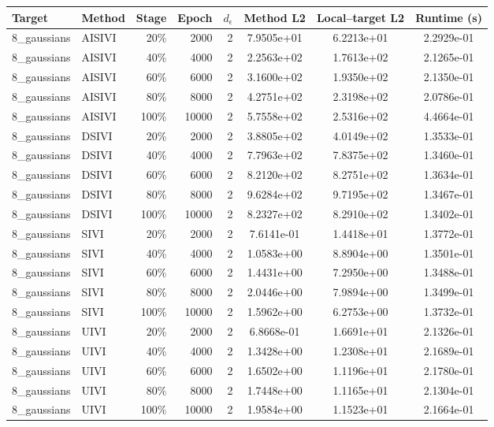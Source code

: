 \begin{tabular}{llrrrccc}
\toprule
Target & Method & Stage & Epoch & $d_\epsilon$ & Method L2 & Local--target L2 & Runtime (s) \\
\midrule
8\_gaussians & AISIVI & 20\% & 2000 & 2 & 7.9505e+01 & 6.2213e+01 & 2.2929e-01 \\
8\_gaussians & AISIVI & 40\% & 4000 & 2 & 2.2563e+02 & 1.7613e+02 & 2.1265e-01 \\
8\_gaussians & AISIVI & 60\% & 6000 & 2 & 3.1600e+02 & 1.9350e+02 & 2.1350e-01 \\
8\_gaussians & AISIVI & 80\% & 8000 & 2 & 4.2751e+02 & 2.3198e+02 & 2.0786e-01 \\
8\_gaussians & AISIVI & 100\% & 10000 & 2 & 5.7558e+02 & 2.5316e+02 & 4.4664e-01 \\
8\_gaussians & DSIVI & 20\% & 2000 & 2 & 3.8805e+02 & 4.0149e+02 & 1.3533e-01 \\
8\_gaussians & DSIVI & 40\% & 4000 & 2 & 7.7963e+02 & 7.8375e+02 & 1.3460e-01 \\
8\_gaussians & DSIVI & 60\% & 6000 & 2 & 8.2120e+02 & 8.2751e+02 & 1.3634e-01 \\
8\_gaussians & DSIVI & 80\% & 8000 & 2 & 9.6284e+02 & 9.7195e+02 & 1.3467e-01 \\
8\_gaussians & DSIVI & 100\% & 10000 & 2 & 8.2327e+02 & 8.2910e+02 & 1.3402e-01 \\
8\_gaussians & SIVI & 20\% & 2000 & 2 & 7.6141e-01 & 1.4418e+01 & 1.3772e-01 \\
8\_gaussians & SIVI & 40\% & 4000 & 2 & 1.0583e+00 & 8.8904e+00 & 1.3501e-01 \\
8\_gaussians & SIVI & 60\% & 6000 & 2 & 1.4431e+00 & 7.2950e+00 & 1.3488e-01 \\
8\_gaussians & SIVI & 80\% & 8000 & 2 & 2.0446e+00 & 7.9894e+00 & 1.3499e-01 \\
8\_gaussians & SIVI & 100\% & 10000 & 2 & 1.5962e+00 & 6.2753e+00 & 1.3732e-01 \\
8\_gaussians & UIVI & 20\% & 2000 & 2 & 6.8668e-01 & 1.6691e+01 & 2.1326e-01 \\
8\_gaussians & UIVI & 40\% & 4000 & 2 & 1.3428e+00 & 1.2308e+01 & 2.1689e-01 \\
8\_gaussians & UIVI & 60\% & 6000 & 2 & 1.6502e+00 & 1.1196e+01 & 2.1780e-01 \\
8\_gaussians & UIVI & 80\% & 8000 & 2 & 1.7448e+00 & 1.1165e+01 & 2.1304e-01 \\
8\_gaussians & UIVI & 100\% & 10000 & 2 & 1.9584e+00 & 1.1523e+01 & 2.1664e-01 \\

\end{tabular}

